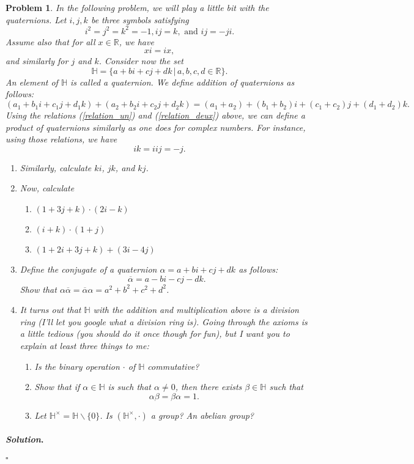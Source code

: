 \documentclass[reqno]{amsart}
\theoremstyle{plain}
\newtheorem{problem}{Problem}
\theoremstyle{definition}
\newenvironment{solution}{\paragraph{\emph{Solution}.}}{\hfill$\square$}
\begin{document}
\begin{problem}
In the following problem, we will play a little bit with the quaternions.  Let $i,j,k$ be three symbols satisfying
\begin{equation} \label{relation_un}
i^{2} = j^{2} = k^{2} = -1, ij = k, \text{ and } ij = -ji.
\end{equation}
Assume also that for all $x \in \mathbb{R}$, we have 
\begin{equation} \label{relation_deux}
xi = ix,
\end{equation}
and similarly for $j$ and $k$.  Consider now the set
$$\mathbb{H} = \{ a + bi + cj + dk \, | \, a,b,c,d \in \mathbb{R}\}.$$
An element of $\mathbb{H}$ is called a \emph{quaternion}.  We define addition of quaternions as follows:
$$(a_{1} + b_{1}i + c_{1}j + d_{1}k) + (a_{2} + b_{2}i + c_{2}j + d_{2}k) = (a_{1} + a_{2}) + (b_{1} + b_{2})i + (c_{1} + c_{2})j + (d_{1} + d_{2})k. $$
Using the \emph{relations} (\ref{relation_un}) and (\ref{relation_deux}) above, we can define a product of quaternions similarly as one does for complex numbers.  For instance, using those relations, we have
$$ik = iij = -j. $$
\begin{enumerate}
\item Similarly, calculate $ki$, $jk$, and $kj$.
\item Now, calculate
\begin{enumerate}
\item $(1 + 3j + k)\cdot (2i -k)$
\item $(i + k) \cdot (1 + j)$
\item $(1 + 2i + 3j + k) + (3i - 4j)$
\end{enumerate}
\item Define the \emph{conjugate} of a quaternion  $\alpha = a + bi + cj + dk$ as follows:
$$\overline{\alpha} = a - bi - cj - dk. $$
Show that $\alpha \overline{\alpha} = \overline{\alpha} \alpha = a^{2} + b^{2} + c^{2} + d^{2}$.
\item It turns out that $\mathbb{H}$ with the addition and multiplication above is a division ring (I'll let you google what a division ring is).  Going through the axioms is a little tedious (you should do it once though for fun), but I want you to explain at least three things to me:  
\begin{enumerate}
\item Is the binary operation $\cdot$ of $\mathbb{H}$ commutative?
\item Show that if $\alpha \in \mathbb{H}$ is such that $\alpha \neq 0$, then there exists $\beta \in \mathbb{H}$ such that
$$\alpha \beta = \beta \alpha = 1. $$
\item Let $\mathbb{H}^{\times} = \mathbb{H} \smallsetminus \{ 0\}$.  Is $(\mathbb{H}^{\times},\cdot)$ a group?  An abelian group? 
\end{enumerate}
\end{enumerate}
\end{problem}
\begin{solution}

\end{solution}
\end{document}
